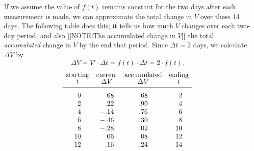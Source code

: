 If we assume the value of $f(t)$ remains constant for the two days
after each measurement is made, we can approximate the total change in
$V$ over these 14 days.  The following table does this; it tells us
how much $V$ changes over each two-day period, and
also
[[NOTE:The accumulated change in $V$]]
the total \emph{accumulated} change in $V$ by the end that
period. Since $\Delta t = 2$ days, we calculate $\Delta V$ by
       \[
\Delta V = V' \cdot \Delta t = f(t) \cdot \Delta t 
                = 2 \cdot f(t).
\]
\addtolength{\arraycolsep}{6pt}
{\small 
        \[
\begin{array}{cccc}
        \mbox{starting} & \mbox{current} & \mbox{accumulated} &
                \mbox{ending} \\ [-2pt]
        t & \Delta V &  \Delta V & t \\[2pt] \hline
        \begin{array}{r}
        \rule{0pt}{14pt} 0 \\ 2 \\ 4 \\ 6 \\ 8 \\ 10 \\ 12 
        \end{array}
        &
        \begin{array}{r}
        \rule{0pt}{14pt} .68 \\ .22 \\ -.14 \\ -.46 \\ -.28 \\
                .06 \\ .16 
        \end{array}
        &
        \begin{array}{r}
        \rule{0pt}{14pt} .68 \\ .90 \\ .76 \\ .30 \\ .02 \\
                .08 \\ .24 
        \end{array}
        &
        \begin{array}{r}
        \rule{0pt}{14pt} 2 \\ 4 \\ 6 \\ 8 \\ 10 \\ 12 \\ 14
        \end{array}
\end{array}
\]
}\addtolength{\arraycolsep}{-6pt}

